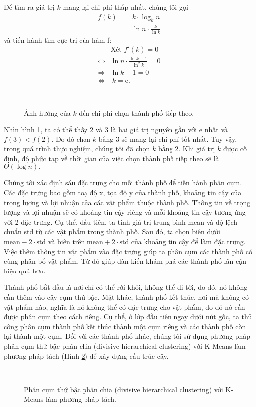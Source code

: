 Để tìm ra giá trị $k$ mang lại chi phí thấp nhất, chúng tôi gọi
\begin{align*}
    f(k) &= k \cdot \log_{k} n \\
    &= \ln n \cdot \frac{k}{\ln k}
\end{align*}
và tiến hành tìm cực trị của hàm f:
\begin{align*}
    &\text{Xét } f'(k) = 0 \\
    \Leftrightarrow& \ln n \cdot \frac{\ln k -1 }{\ln^2  k} = 0\\
    \Rightarrow& \ln k - 1 = 0 \\
    \Leftrightarrow&\ k = \mathrm{e}.
\end{align*}
\begin{figure}
    \centering
     \\
    \caption{Ảnh hưởng của $k$ đến chi phí chọn thành phố tiếp theo.}
    \label{fig:k_value}
\end{figure}
Nhìn hình \ref{fig:k_value}, ta có thể thấy 2 và 3 là hai giá trị nguyên gần với e nhất và $f(3) < f(2)$. Do đó chọn $k$ bằng 3 sẽ mang lại chi phí tốt nhất. Tuy vậy, trong quá trình thực nghiệm, chúng tôi đã chọn $k$ bằng 2. Khi giá trị $k$ được cố định, độ phức tạp về thời gian của việc chọn thành phố tiếp theo sẽ là $\Theta(\log n).$

Chúng tôi xác định sáu đặc trưng cho mỗi thành phố để tiến hành phân cụm. Các đặc trưng bao gồm toạ độ x, tọa độ y của thành phố, khoảng tin cậy  của trọng lượng và lợi nhuận của các vật phẩm thuộc thành phố. Thông tin về trọng lượng và lợi nhuận sẽ có khoảng tin cậy riêng và mỗi khoảng tin cậy tương ứng với 2 đặc trưng. Cụ thể, đầu tiên, ta tính giá trị trung bình mean và độ lệch chuẩn std từ các vật phẩm trong thành phố. Sau đó, ta chọn biên dưới $\mathrm{mean} - 2 \cdot \mathrm{std}$ và biên trên $\mathrm{mean} + 2 \cdot \mathrm{std}$ của khoảng tin cậy để làm đặc trưng. Việc thêm thông tin vật phẩm vào đặc trưng giúp ta phân cụm các thành phố có cùng phân bố vật phẩm. Từ đó giúp đàn kiến khám phá các thành phố lân cận hiệu quả hơn.

Thành phố bắt đầu là nơi chỉ có thể rời khỏi, không thể đi tới, do đó, nó không cần thêm vào cây cụm thứ bậc. Mặt khác, thành phố kết thúc, nơi mà không có vật phẩm nào, nghĩa là nó không thể có đặc trưng cho vật phẩm, do đó nó cần được phân cụm theo cách riêng. Cụ thể, ở lớp đầu tiên ngay dưới nút gốc, ta thủ công phân cụm thành phố kết thúc thành một cụm riêng và các thành phố còn lại thành một cụm. Đối với các thành phố khác, chúng tôi sử dụng phương pháp phân cụm thứ bậc phân chia (divisive hierarchical clustering) với K-Means làm phương pháp tách (Hình \ref{fig:hc_k-means}) để xây dựng cấu trúc cây.
\begin{figure}
    \centering
     \\
    \caption{Phân cụm thứ bậc phân chia (divisive hierarchical clustering) với K-Means làm phương pháp tách.}
    \label{fig:hc_k-means}
\end{figure}

